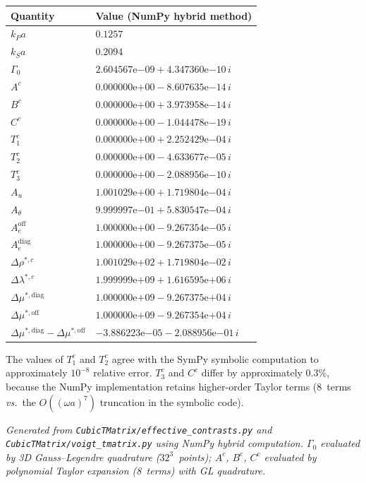 \medskip
\begin{center}
\begin{tabular}{ll}
\toprule
\textbf{Quantity} & \textbf{Value (NumPy hybrid method)} \\
\midrule
$k_P a$ & $0.1257$ \\
$k_S a$ & $0.2094$ \\
\midrule
$\Gamma_0$ & $2.604567\mathrm{e}{-09} + 4.347360\mathrm{e}{-10}\,i$ \\
$A^c$      & $0.000000\mathrm{e}{+00} - 8.607635\mathrm{e}{-14}\,i$ \\
$B^c$      & $0.000000\mathrm{e}{+00} + 3.973958\mathrm{e}{-14}\,i$ \\
$C^c$      & $0.000000\mathrm{e}{+00} - 1.044478\mathrm{e}{-19}\,i$ \\
\midrule
$T_1^c$    & $0.000000\mathrm{e}{+00} + 2.252429\mathrm{e}{-04}\,i$ \\
$T_2^c$    & $0.000000\mathrm{e}{+00} - 4.633677\mathrm{e}{-05}\,i$ \\
$T_3^c$    & $0.000000\mathrm{e}{+00} - 2.088956\mathrm{e}{-10}\,i$ \\
\midrule
$A_u$                    & $1.001029\mathrm{e}{+00} + 1.719804\mathrm{e}{-04}\,i$ \\
$A_\theta$               & $9.999997\mathrm{e}{-01} + 5.830547\mathrm{e}{-04}\,i$ \\
$A_e^{\mathrm{off}}$     & $1.000000\mathrm{e}{+00} - 9.267354\mathrm{e}{-05}\,i$ \\
$A_e^{\mathrm{diag}}$    & $1.000000\mathrm{e}{+00} - 9.267375\mathrm{e}{-05}\,i$ \\
\midrule
$\Delta\rho^{*,c}$           & $1.001029\mathrm{e}{+02} + 1.719804\mathrm{e}{-02}\,i$ \\
$\Delta\lambda^{*,c}$        & $1.999999\mathrm{e}{+09} + 1.616595\mathrm{e}{+06}\,i$ \\
$\Delta\mu^{*,\mathrm{diag}}$ & $1.000000\mathrm{e}{+09} - 9.267375\mathrm{e}{+04}\,i$ \\
$\Delta\mu^{*,\mathrm{off}}$  & $1.000000\mathrm{e}{+09} - 9.267354\mathrm{e}{+04}\,i$ \\
\midrule
$\Delta\mu^{*,\mathrm{diag}} - \Delta\mu^{*,\mathrm{off}}$
  & $-3.886223\mathrm{e}{-05} - 2.088956\mathrm{e}{-01}\,i$ \\
\bottomrule
\end{tabular}
\end{center}

\medskip
The values of $T_1^c$ and $T_2^c$ agree with the SymPy symbolic computation
to approximately $10^{-8}$ relative error.  $T_3^c$ and $C^c$ differ by
approximately $0.3\%$, because the NumPy implementation retains higher-order
Taylor terms (8~terms \textit{vs.}\ the $O((\omega a)^7)$ truncation in the
symbolic code).

\bigskip
\noindent
\textit{Generated from \texttt{CubicTMatrix/effective\_contrasts.py} and
\texttt{CubicTMatrix/voigt\_tmatrix.py} using NumPy hybrid computation.
$\Gamma_0$ evaluated by 3D Gauss--Legendre quadrature ($32^3$~points);
$A^c$, $B^c$, $C^c$ evaluated by polynomial Taylor expansion (8~terms)
with GL quadrature.}
